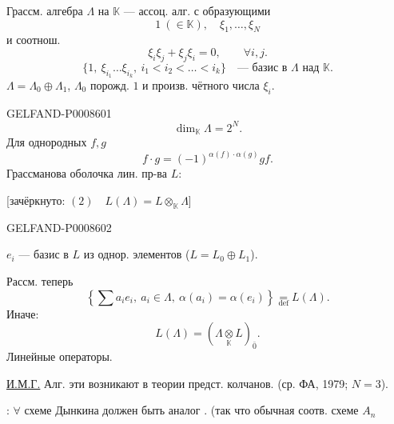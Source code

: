 Грассм. алгебра \(\Lambda\) на \(\mathbb K\) — ассоц. алг. с образующими
\[
1\ (\in\mathbb K),\quad \xi_1,\ldots,\xi_N
\]
и соотнош.
\[
\xi_i\xi_j+\xi_j\xi_i=0,\qquad \forall i,j.
\]
\[
\{1,\ \xi_{i_1}\ldots\xi_{i_k},\ i_1<i_2<\ldots<i_k\}
\quad\text{— базис в }\Lambda\text{ над }\mathbb K.
\]
\(\Lambda=\Lambda_0\oplus\Lambda_1\), \quad
\(\Lambda_0\) порожд. \(1\) и произв. чётного числа \(\xi_i\).


\begin{GelfandAdjacentEvidence}{GELFAND-P000860}{1}
\[
\dim_{\mathbb K}\Lambda=2^N.
\]
Для однородных \(f,g\)
\[
f\cdot g=(-1)^{\alpha(f)\cdot\alpha(g)}gf.\tag{1}
\]
Грассманова оболочка лин. пр-ва \(L\):

[зачёркнуто: \sout{\((2)\quad L(\Lambda)=L\otimes_{\mathbb K}\Lambda\)}]
\end{GelfandAdjacentEvidence}
\begin{GelfandAdjacentEvidence}{GELFAND-P000860}{2}


\(e_i\) — базис в \(L\) из однор. элементов
(\(L=L_0\oplus L_1\)).

Рассм. теперь
\[
\left\{\sum a_i e_i,\ a_i\in\Lambda,\ \alpha(a_i)=\alpha(e_i)\right\}
\underset{\mathrm{def}}{=}L(\Lambda).\tag{2}
\]
 Иначе:
\[
L(\Lambda)=\left(\Lambda\underset{\mathbb K}{\otimes}L\right)_{\bar 0}.
\tag*{\((2)'\)}
\]
Линейные операторы.

\uline{И.М.Г.} Алг. эти возникают в теории предст. колчанов. (ср. ФА, 1979; \(N=3\)).

: \(\forall\) схеме Дынкина должен быть аналог .
(так что обычная соотв. схеме \(A_n\)

\end{GelfandAdjacentEvidence}
